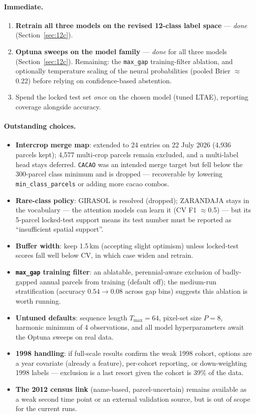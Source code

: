 \documentclass[11pt,a4paper]{article}
\begin{document}
\paragraph{Immediate.}
\begin{enumerate}[leftmargin=1.5em]
\item \textbf{Retrain all three models on the revised 12-class label space} ---
\emph{done} (Section~\ref{sec:12c}).
\item \textbf{Optuna sweeps on the model family} --- \emph{done} for all three models
(Section~\ref{sec:12c}). Remaining: the \texttt{max\_gap} training-filter ablation, and
optionally temperature scaling of the neural probabilities (pooled Brier $\approx$0.22) before
relying on confidence-based abstention.
\item Spend the locked test set \emph{once} on the chosen model (tuned LTAE), reporting
coverage alongside accuracy.
\end{enumerate}

\paragraph{Outstanding choices.}
\begin{itemize}[leftmargin=1.5em]
\item \textbf{Intercrop merge map}: extended to 24 entries on 22 July 2026 (4{,}936 parcels
kept); 4{,}577 multi-crop parcels remain excluded, and a multi-label head stays deferred.
\texttt{CACAO} was an intended merge target but fell below the 300-parcel class minimum and is
dropped --- recoverable by lowering \texttt{min\_class\_parcels} or adding more cacao combos.
\item \textbf{Rare-class policy}: GIRASOL is resolved (dropped); ZARANDAJA stays in the
vocabulary --- the attention models can learn it (CV F1 $\approx$0.5) --- but its 5-parcel
locked-test support means its test number must be reported as ``insufficient spatial
support''.
\item \textbf{Buffer width}: keep 1.5\,km (accepting slight optimism) unless locked-test
scores fall well below CV, in which case widen and retrain.
\item \textbf{\texttt{max\_gap} training filter}: an ablatable, perennial-aware exclusion of
badly-gapped annual parcels from training (default off); the medium-run stratification
(accuracy $0.54 \to 0.08$ across gap bins) suggests this ablation is worth running.
\item \textbf{Untuned defaults}: sequence length $T_{\max}=64$, pixel-set size $P=8$, harmonic
minimum of 4 observations, and all model hyperparameters await the Optuna sweeps on real data.
\item \textbf{1998 handling}: if full-scale results confirm the weak 1998 cohort, options are a
year covariate (already a feature), per-cohort reporting, or down-weighting 1998 labels ---
exclusion is a last resort given the cohort is 39\% of the data.
\item \textbf{The 2012 census link} (name-based, parcel-uncertain) remains available as a weak
second time point or an external validation source, but is out of scope for the current runs.
\end{itemize}
\end{document}
